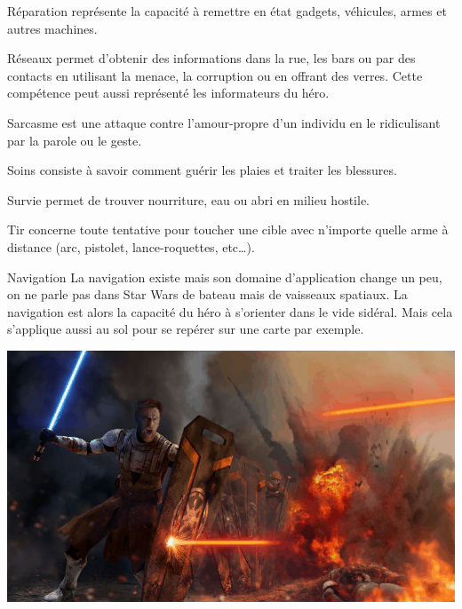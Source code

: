 \begin{description}[align=left]
    \item [Réparation (Int)]
        Réparation représente la capacité à remettre en état gadgets, véhicules, armes et autres machines.

    \item [Réseaux (Int)]
        Réseaux permet d’obtenir des informations dans la rue, les bars ou par des contacts en utilisant la menace, la corruption ou en offrant des verres. Cette compétence peut aussi représenté les informateurs du héro.

    \item [Sarcasme (Int)]
        Sarcasme est une attaque contre l’amour-propre d’un individu en le ridiculisant par la parole ou le geste.

    \item [Soins (Int)]
        Soins consiste à savoir comment guérir les plaies et traiter les blessures.

    \item [Survie (Int)]
        Survie permet de trouver nourriture, eau ou abri en milieu hostile.

    \item [Tir (Agi)]
        Tir concerne toute tentative pour toucher une cible avec n’importe quelle arme à distance (arc, pistolet, lance-roquettes, etc\ldots).
\end{description}
\clearpage
\begin{paperbox}{Navigation}
    La navigation existe mais son domaine d’application change un peu, on ne parle pas dans Star Wars de bateau mais de vaisseaux spatiaux. La navigation est alors la capacité du héro à s’orienter dans le vide sidéral. Mais cela s’applique aussi au sol pour se repérer sur une carte par exemple.
\end{paperbox}

\vspace*{\fill}
\hspace*{-0.5\columnsep}
\includegraphics[width=\textwidth]{img/personnages/skills.jpg}

